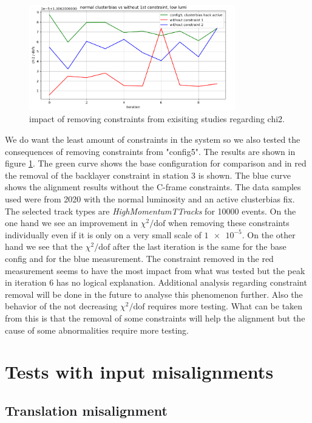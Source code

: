 \begin{figure}
  \centering
  \includegraphics[width=0.8\textwidth]{plots/feb_6_2022/low_lumi_removed_constraints_vs_normal.png}
  \caption{impact of removing constraints from exisiting studies regarding chi2.}
  \label{fig:removeConst}
\end{figure}

We do want the least amount of constraints in the system so we also tested
the consequences of removing constraints from "config5".
The results are shown in figure \ref{fig:removeConst}.
The green curve shows the base configuration for comparison and in red the removal of the backlayer constraint in station 3 is shown. The blue curve shows the alignment results without the C-frame constraints.
The data samples used were from 2020 with the normal luminosity and an active clusterbias fix.
The selected track types are \textit{HighMomentumTTracks} for 10000 events.
On the one hand we see an improvement in $\chi^2 / \text{dof}$ when removing these constraints individually even if it is only on a very small scale of $\num{1e-5}$. On the
other hand we see that the $\chi^2 / \text{dof}$ after the last iteration is the same for the base config and for the blue measurement. The constraint removed in the red measurement seems to have the most impact from what was tested but the peak in iteration 6 has no logical
explanation. Additional analysis regarding constraint removal will be done in the future to analyse this phenomenon further.
Also the behavior of the not decreasing $\chi^2 / \text{dof}$ requires more testing.
What can be taken from this is that the removal of some constraints will help
the alignment but the cause of some abnormalities require more testing.

\section{Tests with input misalignments}
\label{sec:misalignment}
\subsection{Translation misalignment}
\label{sec:misT}

